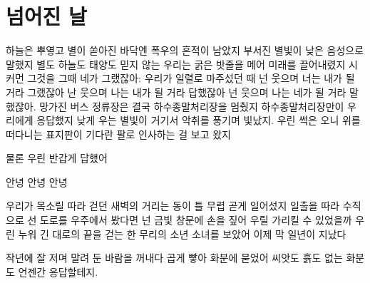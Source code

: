 \hypertarget{uxb118uxc5b4uxc9c4-uxb0a0}{%

\chapter{넘어진 날}\label{uxb118uxc5b4uxc9c4-uxb0a0}}



하늘은 뿌옇고 별이 쏟아진 바닥엔 폭우의 흔적이 남았지 부서진 별빛이 낮은 음성으로 말했지 별도 하늘도 태양도 믿지 않는 우리는 굵은 밧줄을 메어 미래를 끌어내렸지 시커먼 그것을 그때 네가 그랬잖아: 우리가 일렬로 마주섰던 때 넌 웃으며 너는 내가 될 거라 그랬잖아 난 웃으며 나는 내가 될 거라 답했잖아 넌 웃으며 나는 네가 될 거라 말했잖아. 망가진 버스 정류장은 결국 하수종말처리장을 멈췄지 하수종말처리장만이 우리에게 응답했지 낮게 우는 별빛이 거기서 악취를 풍기며 빛났지. 우린 썩은 오니 위를 떠다니는 표지판이 기다란 팔로 인사하는 걸 보고 왔지



물론 우린 반갑게 답했어



안녕 안녕 안녕



우리가 목소릴 따라 걷던 새벽의 거리는 동이 틀 무렵 곧게 일어섰지 일출을 따라 수직으로 선 도로를 우주에서 봤다면 넌 금빛 창문에 손을 짚어 우릴 가리킬 수 있었을까 우린 누워 긴 대로의 끝을 걷는 한 무리의 소년 소녀를 보았어 이제 막 일년이 지났다



작년에 잘 저며 말려 둔 바람을 꺼내다 곱게 빻아 화분에 묻었어 씨앗도 흙도 없는 화분도 언젠간 응답할테지.

